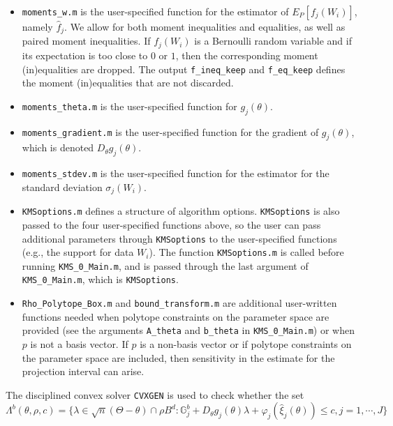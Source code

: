 \documentclass[12pt]{article}
\def\code#1{\texttt{#1}}
\begin{document}
\begin{itemize}
\item \code{moments\_w.m} is the user-specified function for the estimator of $E_P[f_j(W_i)]$, namely $\hat f_{j}$. We allow for both moment inequalities and equalities, as well as paired moment inequalities.  If $f_j(W_i)$ is a Bernoulli random variable and if its expectation is too close to $0$ or $1$, then the corresponding moment (in)equalities are dropped.  The output \code{f\_ineq\_keep} and \code{f\_eq\_keep} defines the moment (in)equalities that are not discarded.

\item \code{moments\_theta.m} is the user-specified function for $g_j(\theta)$.

\item \code{moments\_gradient.m} is the user-specified function for the gradient of $g_j(\theta)$, which is denoted $D_{\theta}g_j(\theta)$.

\item \code{moments\_stdev.m} is the user-specified function for the estimator for the standard deviation $\sigma_j(W_i)$.

\item \code{KMSoptions.m} defines a structure of algorithm options.  \code{KMSoptions} is also passed to the four user-specified functions above, so the user can pass additional parameters through \code{KMSoptions} to the user-specified functions (e.g., the support for data $W_i$).  The function \code{KMSoptions.m} is called before running \code{KMS\_0\_Main.m}, and is passed through the last  argument of \code{KMS\_0\_Main.m}, which is \code{KMSoptions}.

\item \code{Rho\_Polytope\_Box.m} and \code{bound\_transform.m} are additional user-written functions needed when polytope constraints on the parameter space are provided (see  the arguments \code{A\_theta} and \code{b\_theta} in \code{KMS\_0\_Main.m}) or when $p$ is not a basis vector.  If $p$ is a non-basis vector or if polytope constraints on the parameter space are included, then sensitivity in the estimate for the projection interval can arise.  
\end{itemize}
The disciplined convex solver \code{CVXGEN}  is used to check whether the set
\[
\Lambda^b(\theta,\rho,c) = \{ \lambda \in \sqrt{n}(\Theta-\theta) \cap \rho B^d : \mathbb{G}^b_{j} +  D_{\theta}g_j(\theta)\lambda + \varphi_j(\hat \xi_{j}(\theta)) \leq c, j = 1,\cdots,J\}
\]
\end{document}
